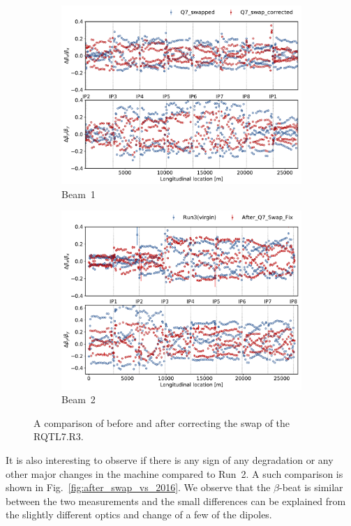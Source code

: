 \documentclass[a4paper]{cernatsnote}
\begin{document}
\begin{figure}[ht]
\begin{subfigure}{.5\textwidth}
  \centering
  \includegraphics[width=.8\linewidth]{plots/beam1/beta_beat_before_after_swap.pdf}  
  \caption{Beam~1}
\end{subfigure}
\begin{subfigure}{.5\textwidth}
  \centering
  \includegraphics[width=.8\linewidth]{plots/beam2/beta_beat_before_vs_after_Q7_swap.pdf}  
  \caption{Beam~2}
\end{subfigure}
\caption{A comparison of before and after correcting the swap of the RQTL7.R3.}
\label{fig:before_after_swap}
\end{figure}

It is also interesting to observe if there is any sign of any degradation or any other major changes in the machine compared to Run~2. A such comparison is shown in Fig.~\ref{fig:after_swap_vs_2016}. We observe that the $\beta$-beat is similar between the two measurements and the small differences can be explained from the slightly different optics and change of a few of the dipoles. 
\end{document}
